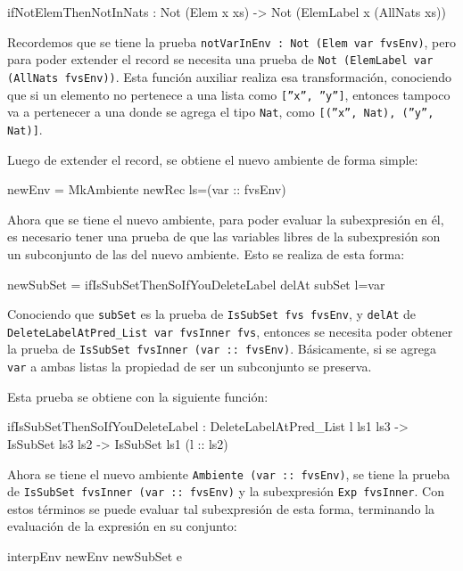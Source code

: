 \begin{code}
ifNotElemThenNotInNats : Not (Elem x xs) ->
  Not (ElemLabel x (AllNats xs))
\end{code}

Recordemos que se tiene la prueba \texttt{notVarInEnv : Not (Elem var fvsEnv)}, pero para poder extender el record se necesita una prueba de \texttt{Not (ElemLabel var (AllNats fvsEnv))}. Esta función auxiliar realiza esa transformación, conociendo que si un elemento no pertenece a una lista como \texttt{[''x'', ''y'']}, entonces tampoco va a pertenecer a una donde se agrega el tipo \texttt{Nat}, como \texttt{[(''x'', Nat), (''y'', Nat)]}.

Luego de extender el record, se obtiene el nuevo ambiente de forma simple:

\begin{code}
newEnv = MkAmbiente newRec {ls=(var :: fvsEnv)}
\end{code}

Ahora que se tiene el nuevo ambiente, para poder evaluar la subexpresión en él, es necesario tener una prueba de que las variables libres de la subexpresión son un subconjunto de las del nuevo ambiente. Esto se realiza de esta forma:

\begin{code}
newSubSet =
  ifIsSubSetThenSoIfYouDeleteLabel delAt subSet {l=var}
\end{code}

Conociendo que \texttt{subSet} es la prueba de \texttt{IsSubSet fvs fvsEnv}, y \texttt{delAt} de \texttt{DeleteLabelAtPred\_List var fvsInner fvs}, entonces se necesita poder obtener la prueba de \texttt{IsSubSet fvsInner (var :: fvsEnv)}. Básicamente, si se agrega \texttt{var} a ambas listas la propiedad de ser un subconjunto se preserva.

Esta prueba se obtiene con la siguiente función:

\begin{code}
ifIsSubSetThenSoIfYouDeleteLabel :
  DeleteLabelAtPred_List l ls1 ls3 ->
  IsSubSet ls3 ls2 -> IsSubSet ls1 (l :: ls2)
\end{code}

Ahora se tiene el nuevo ambiente \texttt{Ambiente (var :: fvsEnv)}, se tiene la prueba de \texttt{IsSubSet fvsInner (var :: fvsEnv)} y la subexpresión \texttt{Exp fvsInner}. Con estos términos se puede evaluar tal subexpresión de esta forma, terminando la evaluación de la expresión en su conjunto:

\begin{code}
interpEnv newEnv newSubSet e
\end{code}

